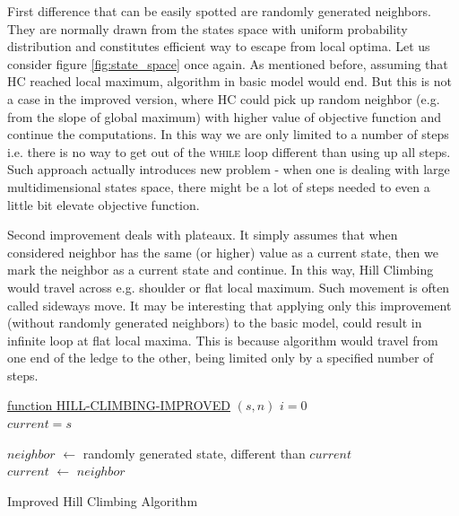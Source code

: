 \documentclass{mini}
\begin{document}
First difference that can be easily spotted are randomly generated neighbors. They are normally drawn from the states space with uniform probability distribution and constitutes efficient way to escape from local optima. Let us consider figure \ref{fig:state_space} once again. As mentioned before, assuming that HC reached local maximum, algorithm in basic model would end. But this is not a case in the improved version, where HC could pick up random neighbor (e.g. from the slope of global maximum) with higher value of objective function and continue the computations. In this way we are only limited to a number of steps i.e. there is no way to get out of the \textsc{while} loop different than using up all steps. Such approach actually introduces new problem - when one is dealing with large multidimensional states space, there might be a lot of steps needed to even a little bit elevate objective function. 

Second improvement deals with plateaux. It simply assumes that when considered neighbor has the same (or higher) value as a current state, then we mark the neighbor as a current state and continue. In this way, Hill Climbing would travel across e.g. shoulder or flat local maximum. Such movement is often called sideways move. It may be interesting that applying only this improvement (without randomly generated neighbors) to the basic model, could result in infinite loop at flat local maxima. This is because algorithm would travel from one end of the ledge to the other, being limited only by a specified number of steps.

\begin{algorithm}[H]
    \underline{function HILL-CLIMBING-IMPROVED} $(s, n)$\;
    $i = 0$ \\
    $current = s$ \\
    {
    	$neighbor$ $\gets$ randomly generated state, different than $current$ \\
    	
    	{
			$current$ $\gets$ $neighbor$
   		}
   		  		
    }
    \caption{Improved Hill Climbing Algorithm}
    \label{algo:hc_improved}
\end{algorithm}
\end{document}

